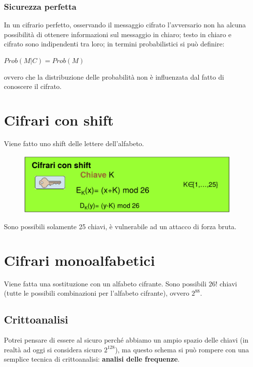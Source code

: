 \subsubsection{Sicurezza perfetta}

In un cifrario perfetto, osservando il messaggio cifrato l'avversario non ha alcuna 
possibilità di ottenere informazioni sul messaggio in chiaro; testo in chiaro e cifrato 
sono indipendenti tra loro; in termini probabilistici si può definire:

\begin{center}
    $Prob(M|C) = Prob(M)$
\end{center}

\noindent ovvero che la distribuzione delle probabilità non è influenzata dal 
fatto di conoscere il cifrato.


\section{Cifrari con shift}

Viene fatto uno shift delle lettere dell'alfabeto.

\begin{figure}[H]
    \centering
    \includegraphics[width=0.8\linewidth]{chapters/chap02/images/shift.png}
\end{figure}

Sono possibili solamente 25 chiavi, è vulnerabile ad un attacco di forza bruta.

\section{Cifrari monoalfabetici}

Viene fatta una sostituzione con un alfabeto cifrante. Sono possibili $26!$ chiavi 
(tutte le possibili combinazioni per l'alfabeto cifrante), ovvero $2^88$.

\subsection{Crittoanalisi}

Potrei pensare di essere al sicuro perché abbiamo un ampio spazio delle chiavi 
(in realtà ad oggi si considera sicuro $2^128$), ma questo schema si può rompere 
con una semplice tecnica di crittoanalisi: \textbf{analisi delle frequenze}.

